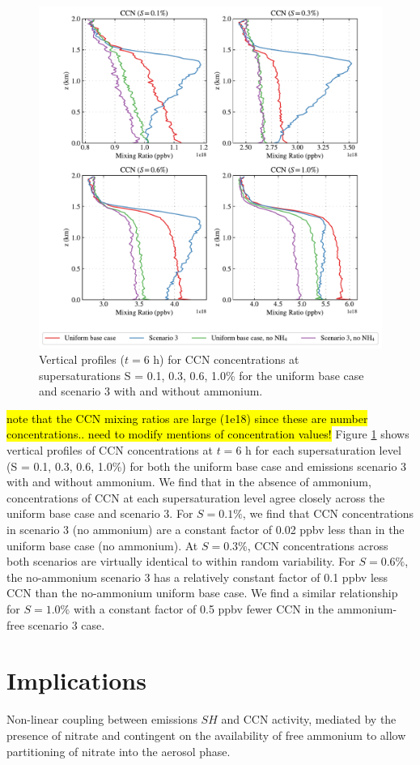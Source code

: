 \begin{figure}[!t]
  \centering
    \includegraphics[width=\textwidth]{figures/chapter5/aerosol-ccn-vertical-profiles-no-nh4-cases-time36.pdf}
    \caption{Vertical profiles ($t = 6$ h) for CCN concentrations at supersaturations S = 0.1, 0.3, 0.6, 1.0\% for the uniform base case and scenario 3 with and without ammonium.}
    \label{fig:vert-profiles-ccn-no-nh4}
\end{figure}

\hl{note that the CCN mixing ratios are large (1e18) since these are number concentrations.. need to modify mentions of concentration values!}
Figure \ref{fig:vert-profiles-ccn-no-nh4} shows vertical profiles of CCN concentrations at $t=6$ h for each supersaturation level (S = 0.1, 0.3, 0.6, 1.0\%) for both the uniform base case and emissions scenario 3 with and without ammonium. We find that in the absence of ammonium, concentrations of CCN at each supersaturation level agree closely across the uniform base case and scenario 3. For $S=0.1\%$, we find that CCN concentrations in scenario 3 (no ammonium) are a constant factor of 0.02 ppbv less than in the uniform base case (no ammonium). At $S=0.3\%$, CCN concentrations across both scenarios are virtually identical to within random variability. For $S=0.6\%$, the no-ammonium scenario 3 has a relatively constant factor of 0.1 ppbv less CCN than the no-ammonium uniform base case. We find a similar relationship for $S=1.0\%$ with a constant factor of 0.5 ppbv fewer CCN in the ammonium-free scenario 3 case. 

\section{Implications}
Non-linear coupling between emissions $SH$ and CCN activity, mediated by the presence of nitrate and contingent on the availability of free ammonium to allow partitioning of nitrate into the aerosol phase.




